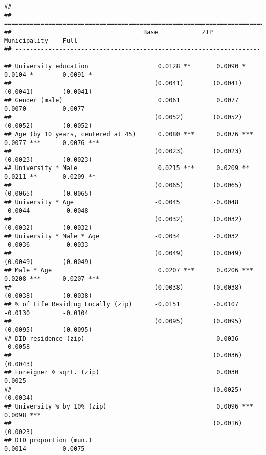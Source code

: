 \documentclass[
]{article}
\begin{document}
\begin{verbatim}
## 
## =================================================================================================
##                                    Base            ZIP             Municipality    Full          
## -------------------------------------------------------------------------------------------------
## University education                   0.0128 **       0.0090 *        0.0104 *        0.0091 *  
##                                       (0.0041)        (0.0041)        (0.0041)        (0.0041)   
## Gender (male)                          0.0061          0.0077          0.0070          0.0077    
##                                       (0.0052)        (0.0052)        (0.0052)        (0.0052)   
## Age (by 10 years, centered at 45)      0.0080 ***      0.0076 ***      0.0077 ***      0.0076 ***
##                                       (0.0023)        (0.0023)        (0.0023)        (0.0023)   
## University * Male                      0.0215 ***      0.0209 **       0.0211 **       0.0209 ** 
##                                       (0.0065)        (0.0065)        (0.0065)        (0.0065)   
## University * Age                      -0.0045         -0.0048         -0.0044         -0.0048    
##                                       (0.0032)        (0.0032)        (0.0032)        (0.0032)   
## University * Male * Age               -0.0034         -0.0032         -0.0036         -0.0033    
##                                       (0.0049)        (0.0049)        (0.0049)        (0.0049)   
## Male * Age                             0.0207 ***      0.0206 ***      0.0208 ***      0.0207 ***
##                                       (0.0038)        (0.0038)        (0.0038)        (0.0038)   
## % of Life Residing Locally (zip)      -0.0151         -0.0107         -0.0130         -0.0104    
##                                       (0.0095)        (0.0095)        (0.0095)        (0.0095)   
## DID residence (zip)                                   -0.0036                         -0.0058    
##                                                       (0.0036)                        (0.0043)   
## Foreigner % sqrt. (zip)                                0.0030                          0.0025    
##                                                       (0.0025)                        (0.0034)   
## University % by 10% (zip)                              0.0096 ***                      0.0098 ***
##                                                       (0.0016)                        (0.0023)   
## DID proportion (mun.)                                                  0.0014          0.0075    

\end{verbatim}
\end{document}
